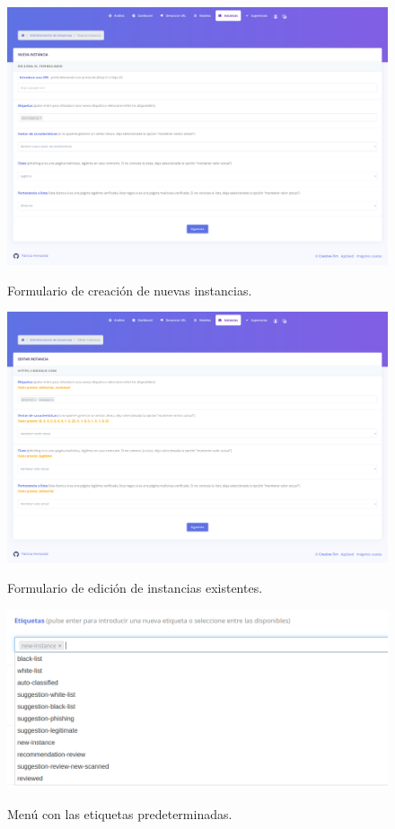 \begin{figure}[h]
	\caption[Manual de usuario: nueva instancia]{Formulario de creación de nuevas instancias.}
	\centering
	\includegraphics[width=\textwidth]{../img/anexos/user_guide/6_new_instance}
	\label{e-5:new-instance}
\end{figure}

\begin{figure}[h]
	\caption[Manual de usuario: editar instancia]{Formulario de edición de instancias existentes.}
	\centering
	\includegraphics[width=\textwidth]{../img/anexos/user_guide/6_edit_instance}
	\label{e-5:edit-instance}
\end{figure}

\begin{figure}[h]
	\caption[Manual de usuario: etiquetas predeterminadas]{Menú con las etiquetas predeterminadas.}
	\centering
	\includegraphics[width=\textwidth]{../img/anexos/user_guide/6_labels}
	\label{e-6:labels}
\end{figure}


